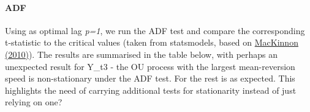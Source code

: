 \documentclass{article}
\begin{document}
    \paragraph{ADF}\label{adf}

Using as optimal lag \emph{p=1}, we run the ADF test and compare the
corresponding t-statistic to the critical values (taken from
statsmodels, based on
\href{http://statsmodels.sourceforge.net/stable/generated/statsmodels.tsa.stattools.adfuller.html\#statsmodels.tsa.stattools.adfuller}{MacKinnon
(2010)}). The results are summarised in the table below, with perhaps an
unexpected result for Y\_t3 - the OU process with the largest
mean-reversion speed is non-stationary under the ADF test. For the rest
is as expected. This highlights the need of carrying additional tests
for stationarity instead of just relying on one?
\end{document}
